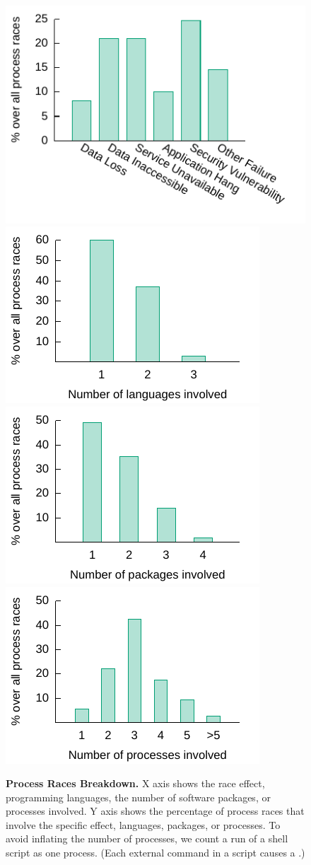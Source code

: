 \begin{figure}[t]
  \includegraphics[width=0.54\linewidth,valign=t]{figures/racepro/race-effects2.pdf}
  \vspace{-2em}
  \hfill
  \includegraphics[width=.45\linewidth,valign=t]{figures/racepro/race-languages}
  \includegraphics[width=.45\linewidth]{figures/racepro/race-packages}
  \hfill
  \includegraphics[width=.45\linewidth]{figures/racepro/race-processes}
\caption{{\bf Process Races Breakdown.}
  X axis shows the race effect, programming languages, the number of software packages, or processes involved.
  Y axis shows the percentage of process races that involve the specific effect, languages, packages, or processes.
  To avoid inflating the number of processes, we count a run of a shell script
  as one process.  (Each external command in a script causes a .)}
\label{racepro:fig:breakdown}
\end{figure}

